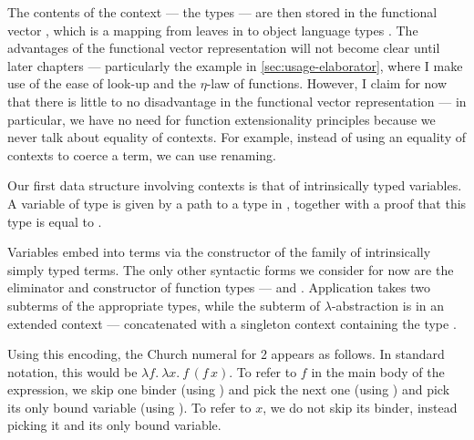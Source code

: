 
The contents of the context --- the types --- are then stored in the functional
vector , which is a mapping from leaves in 
to object language types .
The advantages of the functional vector representation will not become clear
until later chapters --- particularly the example in
\cref{sec:usage-elaborator}, where I make use of the ease of look-up and the
$\eta$-law of functions.
However, I claim for now that there is little to no disadvantage in the
functional vector representation --- in particular, we have no need for
function extensionality principles because we never talk about equality of
contexts.
For example, instead of using an equality of contexts to coerce a term, we can
use renaming.

\Ctx{}

Our first data structure involving contexts is that of intrinsically typed
variables.
A variable of type
\AgdaBound{$\Gamma$}\AgdaSpace{}\AgdaRecord{$\ni$}\AgdaSpace{}
is given by a path  to a type in \AgdaBound{$\Gamma$}, together
with a proof  that this type is equal to .

\Var{}

Variables embed into terms via the  constructor of
the family  of intrinsically simply typed terms.
The only other syntactic forms we consider for now are the eliminator and
constructor of function types  ---
 and .
Application  takes two subterms of the appropriate
types, while the subterm of $\lambda$-abstraction 
is in an extended context \GA{} --- \AgdaBound{$\Gamma$} concatenated with a
singleton context containing the type .

\Term{}

Using this encoding, the Church numeral for 2 appears as follows.
In standard notation, this would be
$\lambda f.~\lambda x.~f\,(f\,x)$.
To refer to $f$ in the main body of the expression, we skip one binder (using
\AgdaInductiveConstructor{$\swarrow$}) and pick the next one
(using \AgdaInductiveConstructor{$\searrow$}) and pick its only bound variable
(using ).
To refer to $x$, we do not skip its binder, instead picking it and its only
bound variable.

